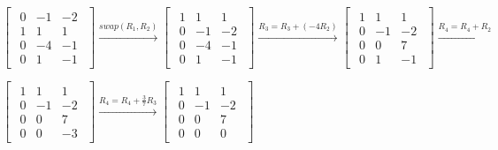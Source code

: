 \singlespacing

\begin{math}
    \begin{bmatrix}
        \begin{array}{ccc}
            0 & -1 & -2 \\
            1 & 1  & 1  \\
            0 & -4 & -1 \\
            0 & 1  & -1
        \end{array}
    \end{bmatrix} \xrightarrow{swap(R_1,R_2)}
    \begin{bmatrix}
        \begin{array}{ccc}
            1 & 1  & 1  \\
            0 & -1 & -2 \\
            0 & -4 & -1 \\
            0 & 1  & -1
        \end{array}
    \end{bmatrix}\xrightarrow{R_3 = R_3 + (-4R_2)}
    \begin{bmatrix}
        \begin{array}{ccc}
            1 & 1  & 1  \\
            0 & -1 & -2 \\
            0 & 0  & 7  \\
            0 & 1  & -1
        \end{array}
    \end{bmatrix}\xrightarrow{R_4 = R_4 + R_2}
\end{math}

\begin{math}
    \begin{bmatrix}
        \begin{array}{ccc}
            1 & 1  & 1  \\
            0 & -1 & -2 \\
            0 & 0  & 7  \\
            0 & 0  & -3
        \end{array}
    \end{bmatrix} \xrightarrow{R_4 = R_4 + \frac{3}{7}R_3}
    \begin{bmatrix}
        \begin{array}{ccc}
            1 & 1  & 1  \\
            0 & -1 & -2 \\
            0 & 0  & 7  \\
            0 & 0  & 0
        \end{array}
    \end{bmatrix}
\end{math}

